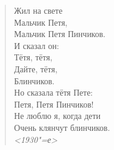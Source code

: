 \begin{center}
\begin{minipage}{0.7\textwidth}
\begin{verse}
\obeylines
\vspace{1em}
Жил на свете \\
Мальчик Петя, \\
Мальчик Петя Пинчиков. \\
И сказал он: \\
Тётя, тётя, \\
Дайте, тётя, \\
Блинчиков. \\

\vspace{0.5em}
Но сказала тётя Пете: \\
Петя, Петя Пинчиков! \\
Не люблю я, когда дети \\
Очень клянчут блинчиков. \\

\vspace{0.5em}
\null\hfill \emph{<1930"=е>}
\vspace{1em}

\end{verse}
\end{minipage}
\end{center}
